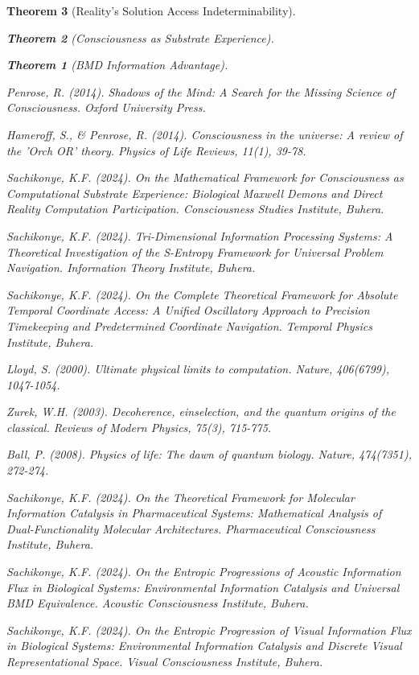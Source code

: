 \documentclass[12pt,a4paper]{article}
\newtheorem{theorem}{Theorem}[section]
\theoremstyle{remark}
\begin{document}
\begin{theorem}[Reality's Solution Access Indeterminability]
\begin{theorem}[Consciousness as Substrate Experience]
\begin{theorem}[BMD Information Advantage]
{{{\begin{thebibliography}{99}
Penrose, R. (2014). \textit{Shadows of the Mind: A Search for the Missing Science of Consciousness}. Oxford University Press.

Hameroff, S., \& Penrose, R. (2014). Consciousness in the universe: A review of the 'Orch OR' theory. \textit{Physics of Life Reviews}, 11(1), 39-78.

Sachikonye, K.F. (2024). On the Mathematical Framework for Consciousness as Computational Substrate Experience: Biological Maxwell Demons and Direct Reality Computation Participation. \textit{Consciousness Studies Institute}, Buhera.

Sachikonye, K.F. (2024). Tri-Dimensional Information Processing Systems: A Theoretical Investigation of the S-Entropy Framework for Universal Problem Navigation. \textit{Information Theory Institute}, Buhera.

Sachikonye, K.F. (2024). On the Complete Theoretical Framework for Absolute Temporal Coordinate Access: A Unified Oscillatory Approach to Precision Timekeeping and Predetermined Coordinate Navigation. \textit{Temporal Physics Institute}, Buhera.

Lloyd, S. (2000). Ultimate physical limits to computation. \textit{Nature}, 406(6799), 1047-1054.

Zurek, W.H. (2003). Decoherence, einselection, and the quantum origins of the classical. \textit{Reviews of Modern Physics}, 75(3), 715-775.

Ball, P. (2008). Physics of life: The dawn of quantum biology. \textit{Nature}, 474(7351), 272-274.

Sachikonye, K.F. (2024). On the Theoretical Framework for Molecular Information Catalysis in Pharmaceutical Systems: Mathematical Analysis of Dual-Functionality Molecular Architectures. \textit{Pharmaceutical Consciousness Institute}, Buhera.

Sachikonye, K.F. (2024). On the Entropic Progressions of Acoustic Information Flux in Biological Systems: Environmental Information Catalysis and Universal BMD Equivalence. \textit{Acoustic Consciousness Institute}, Buhera.

Sachikonye, K.F. (2024). On the Entropic Progression of Visual Information Flux in Biological Systems: Environmental Information Catalysis and Discrete Visual Representational Space. \textit{Visual Consciousness Institute}, Buhera.


\end{thebibliography}}}}
\end{theorem}
\end{theorem}
\end{theorem}
\end{document}
